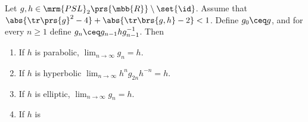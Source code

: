\documentclass[10pt, twoside]{book}
\begin{document}
\begin{lemma}\label{lemma:Jorgensen:lemma_2}
Let $g,h \in \mrm{PSL}_2\prs{\mbb{R}} \setminus \set{\id}$. Assume that $\abs{\tr\prs{g}^2 - 4} + \abs{\tr\brs{g,h} - 2} < 1$. Define $g_0 \ceq g$, and for every $n \geq 1$ define $g_n \ceq g_{n-1} h g_{n-1}^{-1}$. Then
\begin{enumerate}
\item If $h$ is parabolic, $\lim_{n \to \infty} g_n = h$.
\item If $h$ is hyperbolic $\lim_{n \to \infty} h^n g_{2n} h^{-n} = h$.
\item If $h$ is elliptic, $\lim_{n\to\infty} g_n = h$.
\item If $h$ is 
\end{enumerate}
\end{lemma}
\end{document}
